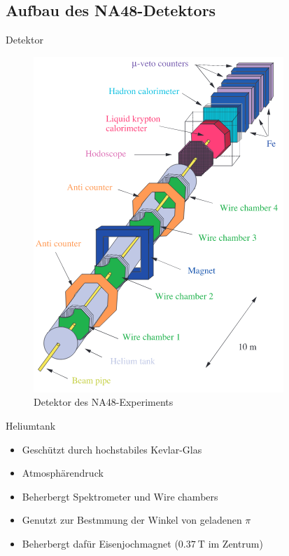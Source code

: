 \documentclass[aspectratio=1610, professionalfonts, 9pt, t]{beamer}
\begin{document}
\subsection{Aufbau des NA48-Detektors}

  \begin{frame}{Detektor}
    \begin{figure}[ht]
      \begin{center}
        \includegraphics[height=0.8\textheight]{Images/na48detector.png} %
        \caption{Detektor des NA48-Experiments}
      \end{center}
    \end{figure}
  \end{frame}

  \begin{frame}{Heliumtank}
    \begin{itemize}
      \item Geschützt durch hochstabiles Kevlar-Glas
      \item Atmosphärendruck
      \item Beherbergt Spektrometer und Wire chambers %
      \item[\rightarrow] Genutzt zur Bestmmung der Winkel von geladenen $\pi$
      \item[\rightarrow] Beherbergt dafür Eisenjochmagnet ($\SI{0.37}{\tesla}$ im Zentrum)
    \end{itemize}
  \end{frame}
\end{document}

